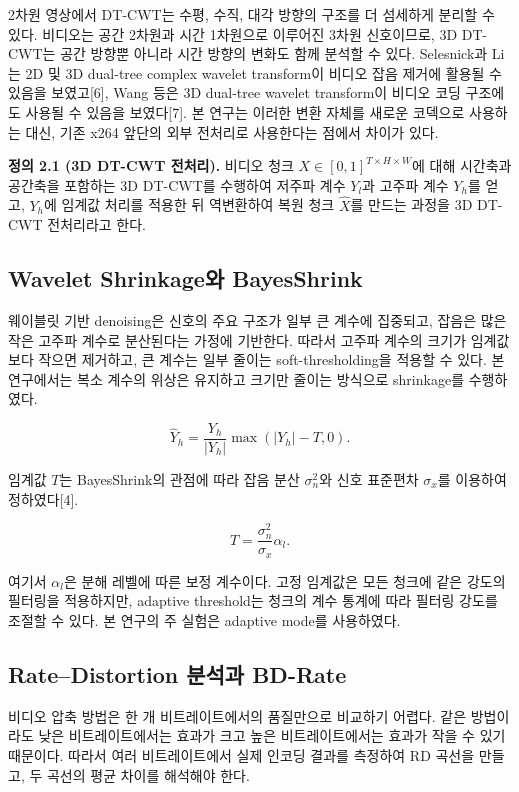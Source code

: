 \documentclass[10pt]{article}
\begin{document}
2차원 영상에서 DT-CWT는 수평, 수직, 대각 방향의 구조를 더 섬세하게 분리할 수 있다. 비디오는 공간 2차원과 시간 1차원으로 이루어진 3차원 신호이므로, 3D DT-CWT는 공간 방향뿐 아니라 시간 방향의 변화도 함께 분석할 수 있다. Selesnick과 Li는 2D 및 3D dual-tree complex wavelet transform이 비디오 잡음 제거에 활용될 수 있음을 보였고[6], Wang 등은 3D dual-tree wavelet transform이 비디오 코딩 구조에도 사용될 수 있음을 보였다[7]. 본 연구는 이러한 변환 자체를 새로운 코덱으로 사용하는 대신, 기존 x264 앞단의 외부 전처리로 사용한다는 점에서 차이가 있다.

\noindent\textbf{정의 2.1 (3D DT-CWT 전처리).}
비디오 청크 $X \in [0,1]^{T \times H \times W}$에 대해 시간축과 공간축을 포함하는 3D DT-CWT를 수행하여 저주파 계수 $Y_l$과 고주파 계수 $Y_h$를 얻고, $Y_h$에 임계값 처리를 적용한 뒤 역변환하여 복원 청크 $\hat{X}$를 만드는 과정을 3D DT-CWT 전처리라고 한다.

\subsection{Wavelet Shrinkage와 BayesShrink}
웨이블릿 기반 denoising은 신호의 주요 구조가 일부 큰 계수에 집중되고, 잡음은 많은 작은 고주파 계수로 분산된다는 가정에 기반한다. 따라서 고주파 계수의 크기가 임계값보다 작으면 제거하고, 큰 계수는 일부 줄이는 soft-thresholding을 적용할 수 있다. 본 연구에서는 복소 계수의 위상은 유지하고 크기만 줄이는 방식으로 shrinkage를 수행하였다.

\begin{equation}
\hat{Y}_h = \frac{Y_h}{|Y_h|}\max(|Y_h|-T,0).
\end{equation}

임계값 $T$는 BayesShrink의 관점에 따라 잡음 분산 $\sigma_n^2$와 신호 표준편차 $\sigma_x$를 이용하여 정하였다[4].

\begin{equation}
T = \frac{\sigma_n^2}{\sigma_x}\alpha_l.
\end{equation}

여기서 $\alpha_l$은 분해 레벨에 따른 보정 계수이다. 고정 임계값은 모든 청크에 같은 강도의 필터링을 적용하지만, adaptive threshold는 청크의 계수 통계에 따라 필터링 강도를 조절할 수 있다. 본 연구의 주 실험은 adaptive mode를 사용하였다.

\subsection{Rate--Distortion 분석과 BD-Rate}
비디오 압축 방법은 한 개 비트레이트에서의 품질만으로 비교하기 어렵다. 같은 방법이라도 낮은 비트레이트에서는 효과가 크고 높은 비트레이트에서는 효과가 작을 수 있기 때문이다. 따라서 여러 비트레이트에서 실제 인코딩 결과를 측정하여 RD 곡선을 만들고, 두 곡선의 평균 차이를 해석해야 한다.
\end{document}
